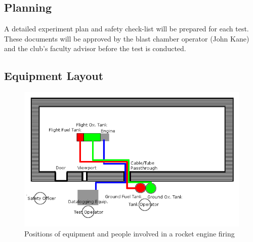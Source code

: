\documentclass{article}
\begin{document}
\subsection{Planning}
A detailed experiment plan and safety check-list will be prepared for each test. These documents will be approved by the blast chamber operator (John Kane) and the club's faculty advisor before the test is conducted.
\subsection{Equipment Layout}
\begin{figure}[h!]
\centering
\includegraphics[width = \textwidth]{blast_chamber_layout.png}
\caption{Positions of equipment and people involved in a rocket engine firing} 
\label{layout}
\end{figure}
\end{document}
